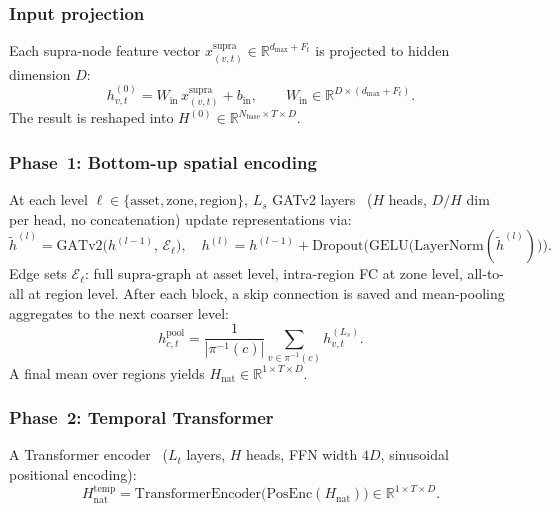 \documentclass{article}
\begin{document}
\subsubsection*{Input projection}

Each supra-node feature vector $x^{\mathrm{supra}}_{(v,t)} \in \mathbb{R}^{d_{\max} + F_t}$ is projected to hidden dimension $D$:
\begin{equation}
h^{(0)}_{v,t} = W_{\mathrm{in}}\, x^{\mathrm{supra}}_{(v,t)} + b_{\mathrm{in}}, \qquad W_{\mathrm{in}} \in \mathbb{R}^{D \times (d_{\max}+F_t)}.
\end{equation}
The result is reshaped into $H^{(0)} \in \mathbb{R}^{N_{\mathrm{base}} \times T \times D}$.

\subsubsection*{Phase~1: Bottom-up spatial encoding}

At each level $\ell \in \{\text{asset}, \text{zone}, \text{region}\}$, $L_s$ GATv2 layers~\citep{brody_how_2022} ($H$ heads, $D/H$ dim per head, no concatenation) update representations via:
\begin{equation}
\tilde{h}^{(l)} = \mathrm{GATv2}\!\bigl(h^{(l-1)},\, \mathcal{E}_\ell\bigr), \quad
h^{(l)} = h^{(l-1)} + \mathrm{Dropout}\!\bigl(\mathrm{GELU}\!\bigl(\mathrm{LayerNorm}(\tilde{h}^{(l)})\bigr)\bigr).
\label{eq:gat_block}
\end{equation}
Edge sets $\mathcal{E}_\ell$: full supra-graph at asset level, intra-region FC at zone level, all-to-all at region level. After each block, a skip connection is saved and mean-pooling aggregates to the next coarser level:
\begin{equation}
h^{\mathrm{pool}}_{c,t} = \frac{1}{|\pi^{-1}(c)|} \sum_{v \in \pi^{-1}(c)} h^{(L_s)}_{v,t}.
\label{eq:pool}
\end{equation}
A final mean over regions yields $H_{\mathrm{nat}} \in \mathbb{R}^{1 \times T \times D}$.

\subsubsection*{Phase~2: Temporal Transformer}

A Transformer encoder~\citep{vaswani2017attention} ($L_t$ layers, $H$ heads, FFN width $4D$, sinusoidal positional encoding):
\begin{equation}
H^{\mathrm{temp}}_{\mathrm{nat}} = \mathrm{TransformerEncoder}\!\bigl(\mathrm{PosEnc}(H_{\mathrm{nat}})\bigr) \in \mathbb{R}^{1 \times T \times D}.
\label{eq:temporal_transformer}
\end{equation}
\end{document}
